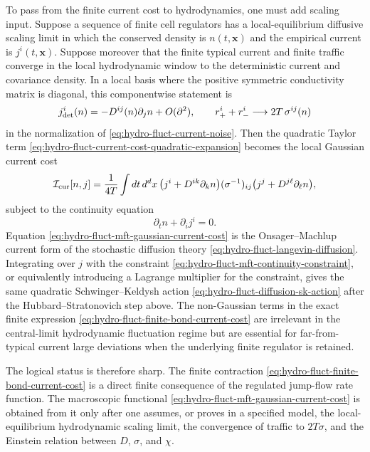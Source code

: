 To pass from the finite current cost to hydrodynamics, one must add scaling
input.  Suppose a sequence of finite cell regulators has a local-equilibrium
diffusive scaling limit in which the conserved density is \(n(t,\mathbf x)\)
and the empirical current is \(j^i(t,\mathbf x)\).  Suppose moreover that
the finite typical current and finite traffic converge in the local
hydrodynamic window to the deterministic current and covariance density.  In
a local basis where the positive symmetric conductivity matrix is diagonal,
this componentwise statement is
\[
  j^i_{\rm det}(n)
  =
  -D^{ij}(n)\partial_jn+O(\partial^2),
  \qquad
  r_+^i+r_-^i
  \longrightarrow
  2T\,\sigma^{ij}(n)
\]
in the normalization of \eqref{eq:hydro-fluct-current-noise}.  Then the
quadratic Taylor term
\eqref{eq:hydro-fluct-current-cost-quadratic-expansion} becomes the local
Gaussian current cost
\begin{equation}
  \mathcal I_{\rm cur}[n,j]
  =
  \frac{1}{4T}
  \int dt\,d^dx\,
  \bigl(j^i+D^{ik}\partial_kn\bigr)
  (\sigma^{-1})_{ij}
  \bigl(j^j+D^{j\ell}\partial_\ell n\bigr),
  \label{eq:hydro-fluct-mft-gaussian-current-cost}
\end{equation}
subject to the continuity equation
\begin{equation}
  \partial_t n+\partial_i j^i=0 .
  \label{eq:hydro-fluct-mft-continuity-constraint}
\end{equation}
Equation \eqref{eq:hydro-fluct-mft-gaussian-current-cost} is the
Onsager--Machlup current form of the stochastic diffusion theory
\eqref{eq:hydro-fluct-langevin-diffusion}.  Integrating over \(j\) with the
constraint \eqref{eq:hydro-fluct-mft-continuity-constraint}, or equivalently
introducing a Lagrange multiplier for the constraint, gives the same
quadratic Schwinger--Keldysh action
\eqref{eq:hydro-fluct-diffusion-sk-action} after the
Hubbard--Stratonovich step above.  The non-Gaussian terms in the exact
finite expression \eqref{eq:hydro-fluct-finite-bond-current-cost} are
irrelevant in the central-limit hydrodynamic fluctuation regime but are
essential for far-from-typical current large deviations when the underlying
finite regulator is retained.

The logical status is therefore sharp.  The finite contraction
\eqref{eq:hydro-fluct-finite-bond-current-cost} is a direct finite
consequence
of the regulated jump-flow rate function.  The macroscopic functional
\eqref{eq:hydro-fluct-mft-gaussian-current-cost} is obtained from it only
after one assumes, or proves in a specified model, the local-equilibrium
hydrodynamic scaling limit, the convergence of traffic to \(2T\sigma\), and
the Einstein relation between \(D\), \(\sigma\), and \(\chi\).

